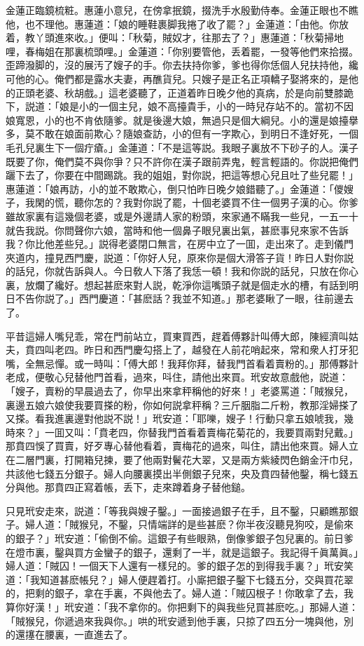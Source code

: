 金蓮正臨鏡梳粧。惠蓮小意兒，在傍拿抿鏡，掇洗手水殷勤侍奉。金蓮正眼也不瞧他，也不理他。惠蓮道：「娘的睡鞋裹脚我捲了收了罷？」金蓮道：「由他。你放着，教丫頭進來收。」便叫：「秋菊，賊奴才，往那去了？」惠蓮道：「秋菊掃地哩，春梅姐在那裏梳頭哩。」金蓮道：「你别要管他，丢着罷，一發等他們來拾掇。歪蹄潑脚的，沒的展汚了嫂子的手。你去扶持你爹，爹也得你恁個人兒扶持他，纔可他的心。俺們都是露水夫妻，再醮貨兒。只嫂子是正名正項轎子娶將來的，是他的正頭老婆、秋胡戲。」這老婆聽了，正道着昨日晚夕他的真病，於是向前雙膝跪下，説道：「娘是小的一個主兒，娘不高擡貴手，小的一時兒存站不的。當初不因娘寬恩，小的也不肯依隨爹。就是後邊大娘，無過只是個大綱兒。小的還是娘擡擧多，莫不敢在娘面前欺心？隨娘查訪，小的但有一字欺心，到明日不逢好死，一個毛孔兒裏生下一個疔瘡。」金蓮道：「不是這等説。我眼子裏放不下砂子的人。漢子既要了你，俺們莫不與你爭？只不許你在漢子跟前弄鬼，輕言輕語的。你説把俺們躧下去了，你要在中間踢跳。我的姐姐，對你説，把這等想心兒且吐了些兒罷！」惠蓮道：「娘再訪，小的並不敢欺心，倒只怕昨日晚夕娘錯聽了。」金蓮道：「儍嫂子，我閑的慌，聽你怎的？我對你説了罷，十個老婆買不住一個男子漢的心。你爹雖故家裏有這幾個老婆，或是外邊請人家的粉頭，來家通不瞞我一些兒，一五一十就告我説。你問聲你六娘，當時和他一個鼻子眼兒裏出氣，甚麽事兒來家不告訴我？你比他差些兒。」説得老婆閉口無言，在房中立了一囬，走出來了。走到儀門夾道内，撞見西門慶，説道：「你好人兒，原來你是個大滑答子貨！昨日人對你説的話兒，你就告訴與人。今日敎人下落了我恁一頓！我和你説的話兒，只放在你心裏，放爛了纔好。想起甚麽來對人説，乾淨你這嘴頭子就是個走水的槽，有話到明日不告你説了。」西門慶道：「甚麽話？我並不知道。」那老婆瞅了一眼，往前邊去了。

平昔這婦人嘴兒乖，常在門前站立，買東買西，趕着傅夥計叫傅大郎，陳經濟叫姑夫，賁四叫老四。昨日和西門慶勾搭上了，越發在人前花哨起來，常和衆人打牙犯嘴，全無忌憚。或一時叫：「傅大郎！我拜你拜，替我門首看着賣粉的。」那傅夥計老成，便敬心兒替他門首看，過來，呌住，請他出來買。玳安故意戲他，説道：「嫂子，賣粉的早晨過去了，你早出來拿秤稱他的好來！」老婆罵道：「賊猴兒，裏邊五娘六娘使我要買搽的粉，你如何説拿秤稱？三斤胭脂二斤粉，教那淫婦搽了又搽。看我進裏邊對他説不説！」玳安道：「耶嚛，嫂子！行動只拿五娘唬我，幾時來？」一囬又叫：「賁老四，你替我門首看着賣梅花菊花的，我要買兩對兒戴。」那賁四悞了買賣，好歹專心替他看着，賣梅花的過來，叫住，請出他來買。婦人立在二層門裏，打開箱兒揀，要了他兩對鬢花大翠，又是兩方紫綾閃色銷金汗巾兒，共該他七錢五分銀子。婦人向腰裏摸出半側銀子兒來，央及賁四替他鑿，稱七錢五分與他。那賁四正寫着帳，丢下，走來蹲着身子替他鎚。

只見玳安走來，説道：「等我與嫂子鑿。」一面接過銀子在手，且不鑿，只顧瞧那銀子。婦人道：「賊猴兒，不鑿，只情端詳的是些甚麽？你半夜沒聽見狗咬，是偷來的銀子？」玳安道：「偷倒不偷。這銀子有些眼熟，倒像爹銀子包兒裏的。前日爹在燈市裏，鑿與買方金蠻子的銀子，還剩了一半，就是這銀子。我記得千眞萬眞。」婦人道：「賊囚！一個天下人還有一樣兒的。爹的銀子怎的到得我手裏？」玳安笑道：「我知道甚麽帳兒？」婦人便趕着打。小廝把銀子鑿下七錢五分，交與買花翠的，把剩的銀子，拿在手裏，不與他去了。婦人道：「賊囚根子！你敢拿了去，我算你好漢！」玳安道：「我不拿你的。你把剩下的與我些兒買甚麽吃。」那婦人道：「賊猴兒，你遞過來我與你。」哄的玳安遞到他手裏，只掠了四五分一塊與他，別的還㩙在腰裏，一直進去了。

